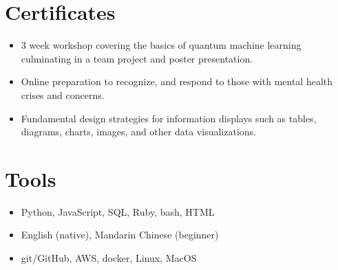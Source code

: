 \documentclass{cultvoucher}
\begin{document}
\section{Certificates}
\begin{itemize}
	\item 3 week workshop covering the basics of quantum machine learning culminating in a team project and poster presentation.
\end{itemize}
\begin{itemize}
	\item Online preparation to recognize, and respond to those with mental health crises and concerns.
\end{itemize}
\begin{itemize}
	\item Fundamental design strategies for information displays such as tables, diagrams, charts, images, and other data visualizations.
\end{itemize}


\section{Tools}
\begin{itemize}
	\item Python, JavaScript, SQL, Ruby, bash, HTML
	\item English (native), Mandarin Chinese (beginner)
\end{itemize}
\begin{itemize}
	\item git/GitHub, AWS, docker, Linux, MacOS
\end{itemize}
\end{document}

